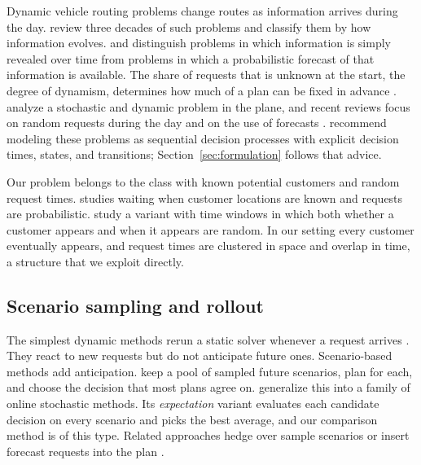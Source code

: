\documentclass[5p,times,authoryear]{elsarticle}
\begin{document}
Dynamic vehicle routing problems change routes as information arrives during the day. \citet{psaraftis2016dynamic} review three decades of such problems and classify them by how information evolves. \citet{pillac2013review} and \citet{ritzinger2016survey} distinguish problems in which information is simply revealed over time from problems in which a probabilistic forecast of that information is available. The share of requests that is unknown at the start, the degree of dynamism, determines how much of a plan can be fixed in advance \citep{larsen2002partially}. \citet{bertsimas1991stochastic} analyze a stochastic and dynamic problem in the plane, and recent reviews focus on random requests during the day \citep{zhang2023dvrpreview} and on the use of forecasts \citep{soeffker2022prescriptive}. \citet{ulmer2020modeling} recommend modeling these problems as sequential decision processes with explicit decision times, states, and transitions; Section~\ref{sec:formulation} follows that advice.

Our problem belongs to the class with known potential customers and random request times. \citet{thomas2007waiting} studies waiting when customer locations are known and requests are probabilistic. \citet{saintguillain2017ssvrptw} study a variant with time windows in which both whether a customer appears and when it appears are random. In our setting every customer eventually appears, and request times are clustered in space and overlap in time, a structure that we exploit directly.

\subsection{Scenario sampling and rollout}

The simplest dynamic methods rerun a static solver whenever a request arrives \citep{gendreau1999parallel}. They react to new requests but do not anticipate future ones. Scenario-based methods add anticipation. \citet{bent2004scenario} keep a pool of sampled future scenarios, plan for each, and choose the decision that most plans agree on. \citet{vanhentenryck2006online} generalize this into a family of online stochastic methods. Its \emph{expectation} variant evaluates each candidate decision on every scenario and picks the best average, and our comparison method is of this type. Related approaches hedge over sample scenarios \citep{hvattum2006sample} or insert forecast requests into the plan \citep{ichoua2006exploiting,ghiani2009anticipatory}.
\end{document}
